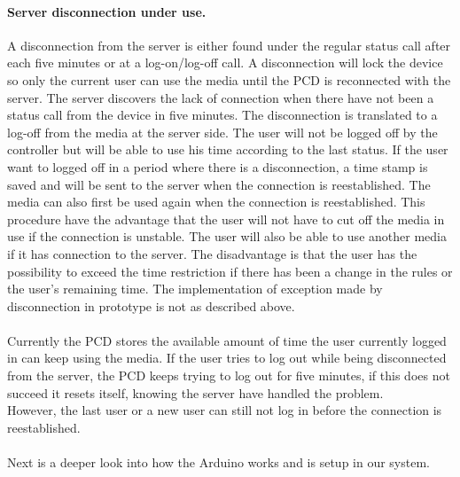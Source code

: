 \paragraph{Server disconnection under use.}
\label{sec:ServerDisconnectionUnderUse}
A disconnection from the server is either found under the regular status call after each five minutes or at a log-on/log-off call. A disconnection will lock the device so only the current user can use the media until the PCD is reconnected with the server. The server discovers the lack of connection when there have not been a status call from the device in five minutes. The disconnection is translated to a log-off from the media at the server side. 
The user will not be logged off by the controller but will be able to use his time according to the last status. If the user want to logged off in a period where there is a disconnection, a time stamp is saved and will be sent to the server when the connection is reestablished. The media can also first be used again when the connection is reestablished. 
This procedure have the advantage that the user will not have to cut off the media in use if the connection is unstable. The user will also be able to use another media if it has connection to the server.
The disadvantage is that the user has the possibility to exceed the time restriction if there has been a change in the rules or the user's remaining time. \newline
The implementation of exception made by disconnection in prototype is not as described above.\\
\\
Currently the PCD stores the available amount of time the user currently logged in can keep using the media. 
If the user tries to log out while being disconnected from the server, the PCD keeps trying to log out for five minutes, if this does not succeed it resets itself, knowing the server have handled the problem.\\
However, the last user or a new user can still not log in before the connection is reestablished.\\
\\

Next is a deeper look into how the Arduino works and is setup in our system.